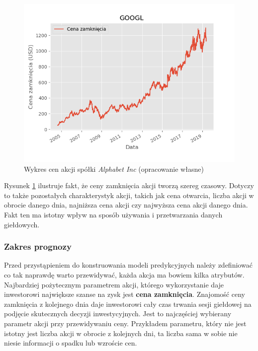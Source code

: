 \documentclass[a4paper, twoside, 11pt, openright]{article}
\begin{document}
\begin{figure}[H]
\centering \includegraphics[scale=0.9]{img/GOOGL_adj_close.png}
\caption{Wykres cen akcji spółki \textit{Alphabet Inc} (opracowanie własne)}
\label{img:alphabet_history}
\end{figure}

Rysunek \ref{img:alphabet_history} ilustruje fakt, że ceny zamknięcia akcji tworzą szereg czasowy. Dotyczy to także pozostałych charakterystyk akcji, takich jak cena otwarcia, liczba akcji w obrocie danego dnia, najniższa cena akcji czy najwyższa cena akcji danego dnia. Fakt ten ma istotny wpływ na sposób używania i przetwarzania danych giełdowych.

\subsubsection{Zakres prognozy}

Przed przystąpieniem do konstruowania modeli predykcyjnych należy zdefiniować co tak naprawdę warto przewidywać, każda akcja ma bowiem kilka atrybutów. Najbardziej pożytecznym parametrem akcji, którego wykorzystanie daje inwestorowi największe szanse na zysk jest \textbf{cena zamknięcia}. Znajomość ceny zamknięcia z kolejnego dnia daje inwestorowi cały czas trwania sesji giełdowej na podjęcie skutecznych decyzji inwestycyjnych. Jest to najczęściej wybierany parametr akcji przy przewidywaniu ceny. Przykładem parametru, który nie jest istotny jest liczba akcji w obrocie z kolejnych dni, ta liczba sama w sobie nie niesie informacji o spadku lub wzroście cen.

\bigskip
\end{document}
